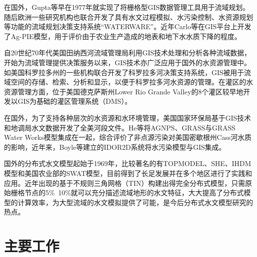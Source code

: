 在国外，Gupta等\cite{gupta1977distributed}早在1977年就实现了将栅格型GIS数据管理工具用于流域规划。随后欧洲一些研究机构也联合开发了具有水文过程模拟、水污染控制、水资源规划等功能的流域规划决策支持系统“WATERWARE”\cite{jamieson1996waterware}。近年Carlo等\cite{giupponi2006ag}在GIS平台上开发了Ag-PIE模型，用于评价由于农业生产造成的地表和地下水水质下降的程度。

自20世纪70年代美国田纳西河流域管理局利用GIS技术处理和分析各种流域数据，开始为流域管理提供决策服务以来，GIS技术亦广泛应用于国外的水资源管理中。如美国科罗拉多州的一些机构联合开发了科罗拉多河决策支持系统，GIS被用于流域空间的存储、检索、分析和显示，以便于科罗拉多河水资源的管理\cite{美国科罗拉多河}。在灌区的水资源管理方面，位于美国德克萨斯州Lower Rio Grande Valley的8个灌区较早地开发以GIS为基础的灌区管理系统（DMS）\cite{得克萨斯州}。


在国外，为了支持各种层次的水资源和水环境管理，美国国家环保局基于GIS技术和地调局水文数据开发了全美河段文件\cite{horn1993water}。He等\cite{he1993integration}将AGNPS、GRASS与GRASS Water Works模型集成在一起，综合评价了非点源污染对美国密歇根州Cass河水质的影响，近年来，Boyle等\cite{tsanis20012d}建立的IDOR2D系统将水污染模型与GIS集成。


国外的分布式水文模型起始于1969年，比较著名的有TOPMODEL、SHE、IHDM模型和美国农业部的SWAT模型，目前得到了长足发展并在多个地区进行了实践和应用\cite{brath2004analysis}。近年出现的基于不规则三角网格（TIN）构建出得完全分布式模型，只需原始栅格节点的5\%~10\%就可以充分描述流域地形的水文特征，大大提高了分布式模型的计算效率，为大型流域的水文模拟提供了可能，是今后分布式水文模型研究的热点\cite{ivanov2004catchment}。

\section{主要工作}

